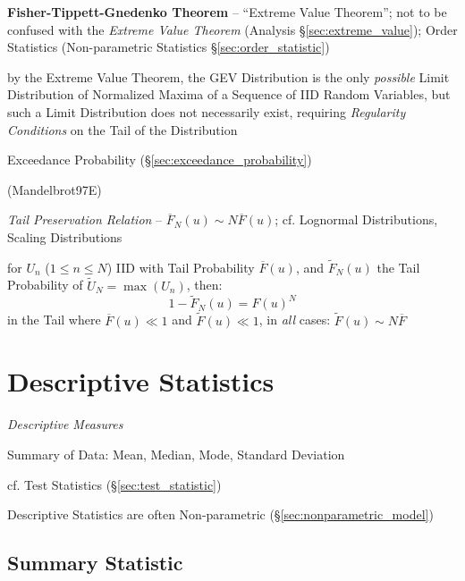 \textbf{Fisher-Tippett-Gnedenko Theorem} -- ``Extreme Value Theorem''; not to be
confused with the \emph{Extreme Value Theorem} (Analysis
\S\ref{sec:extreme_value}); Order Statistics (Non-parametric Statistics
\S\ref{sec:order_statistic})

by the Extreme Value Theorem, the GEV Distribution is the only \emph{possible}
Limit Distribution of Normalized Maxima of a Sequence of IID Random Variables,
but such a Limit Distribution does not necessarily exist, requiring
\emph{Regularity Conditions} on the Tail of the Distribution

Exceedance Probability (\S\ref{sec:exceedance_probability})

(Mandelbrot97E)

\emph{Tail Preservation Relation} -- $\overline{F}_N(u) \sim N \overline{F}(u)$;
cf. Lognormal Distributions, Scaling Distributions

for $U_n$ ($1 \leq n \leq N$) IID with Tail Probability $\overline{F}(u)$, and
$\tilde{F}_N(u)$ the Tail Probability of $\tilde{U}_N = \max(U_n)$, then:
\[
  1 - \tilde{F}_N(u) = F(u)^N
\]
in the Tail where $\overline{F}(u) \ll 1$ and $\tilde{F}(u) \ll 1$, in
\emph{all} cases: $\tilde{F}(u) \sim N \overline{F}$



\section{Descriptive Statistics}\label{sec:descriptive_statistics}

\emph{Descriptive Measures}

Summary of Data: Mean, Median, Mode, Standard Deviation

cf. Test Statistics (\S\ref{sec:test_statistic})

Descriptive Statistics are often Non-parametric
(\S\ref{sec:nonparametric_model})



\subsection{Summary Statistic}\label{sec:summary_statistic}

